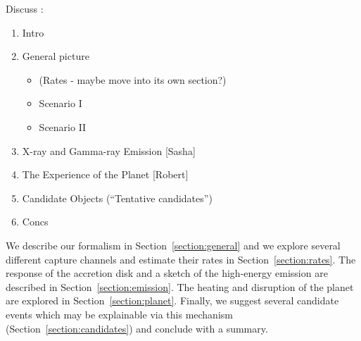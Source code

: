 Discuss : 
\begin{enumerate}
\item  Intro  
\item  General picture  
\begin{itemize}
\item (Rates - maybe move into its own section?) 
\item  Scenario I   
\item  Scenario II  
\end{itemize}
\item  X-ray and Gamma-ray Emission [Sasha] 
\item  The Experience of the Planet [Robert] 
\item  Candidate Objects (``Tentative candidates'') 
\item  Concs  
\end{enumerate}


We describe our formalism in Section~\ref{section:general} and we
explore several different capture channels and estimate their rates in
Section~\ref{section:rates}.  The response of the accretion disk and a
sketch of the high-energy emission are described in
Section~\ref{section:emission}.  The heating and disruption of the
planet are explored in Section~\ref{section:planet}.  Finally, we
suggest several candidate events which may be explainable via this
mechanism (Section~\ref{section:candidates}) and conclude with a
summary.
